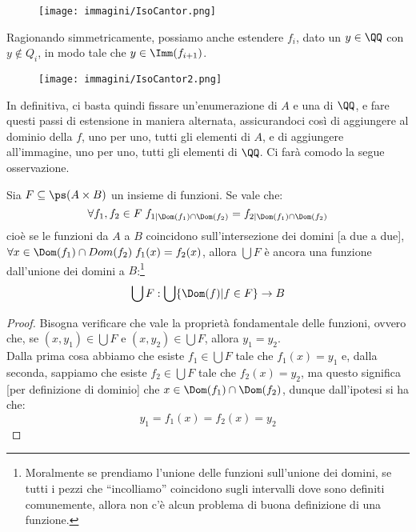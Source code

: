 \documentclass[11pt]{scrartcl}
\begin{document}
\begin{figure}[h]
	\centering
	\texttt{[image: immagini/IsoCantor.png]}
\end{figure}

Ragionando simmetricamente, possiamo anche estendere $f_i$, dato un $y \in \QQ$ con $y \not\in Q_i$, in modo tale che $y \in \Imm(f_{i+1})$.

\begin{center}
	\begin{figure}[h!]
		\centering
		\texttt{[image: immagini/IsoCantor2.png]}
	\end{figure}
\end{center}

In definitiva, ci basta quindi fissare un'enumerazione di $A$ e una di $\QQ$, e fare questi passi di estensione in maniera alternata, assicurandoci così di aggiungere al dominio della $f$, uno per uno,
tutti gli elementi di $A$, e di aggiungere all'immagine, uno per uno, tutti gli elementi di $\QQ$. Ci farà comodo la segue osservazione.

\begin{remark}
	Sia $F \subseteq \ps(A \times B)$ un insieme di funzioni. Se vale che:	
	\[ \forall f_1,f_2 \in F \; f_{1|\Dom(f_1) \cap \Dom(f_2)} = f_{2|\Dom(f_1) \cap \Dom(f_2)}
			\]
	cioè se le funzioni da $A$ a $B$ coincidono sull'intersezione dei domini [a due a due], $\forall x \in \Dom(f_1) \cap Dom(f_2) \; f_1(x) = f_2(x)$, allora $\bigcup F$ è ancora una funzione dall'unione dei domini a $B$:\footnote{Moralmente se prendiamo l'unione delle funzioni 
	sull'unione dei domini, se tutti i pezzi che ``incolliamo'' coincidono sugli intervalli dove sono definiti comunemente, allora non c'è alcun problema di buona definizione di una funzione.}
	\[ \bigcup F : \bigcup\{\Dom(f) | f\in F\} \rightarrow B
		\]
\end{remark}

\begin{proof}
	Bisogna verificare che vale la proprietà fondamentale delle funzioni, ovvero che, se $(x,y_1) \in \bigcup F$ e $(x,y_2) \in \bigcup F$, allora $y_1 = y_2$.\\
	Dalla prima cosa abbiamo che esiste $f_1 \in \bigcup F$ tale che $f_1(x) = y_1$ e, dalla seconda, sappiamo che esiste $f_2 \in \bigcup F$ tale che $f_2(x) = y_2$, ma questo significa [per definizione di dominio]
	che $x \in \Dom(f_1) \cap \Dom(f_2)$, dunque dall'ipotesi si ha che:
	\[ y_1 = f_1(x) = f_2(x) = y_2
		\]
\end{proof}
\end{document}
